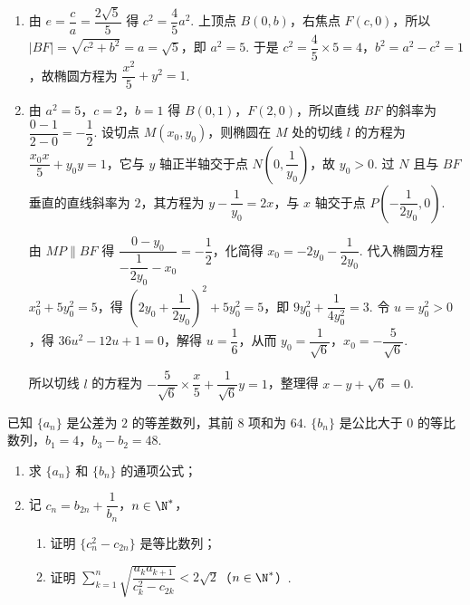 \begin{solution}
\begin{enumerate}
\item 由 \(e=\dfrac ca=\dfrac{2\sqrt5}5\) 得 \(c^2=\dfrac45a^2\). 上顶点 \(B(0,b)\)，右焦点 \(F(c,0)\)，所以 \(|BF|=\sqrt{c^2+b^2}=a=\sqrt5\)，即 \(a^2=5\). 于是 \(c^2=\dfrac45\times5=4\)，\(b^2=a^2-c^2=1\)，故椭圆方程为 \(\dfrac{x^2}5+y^2=1\).

\item 由 \(a^2=5\)，\(c=2\)，\(b=1\) 得 \(B(0,1)\)，\(F(2,0)\)，所以直线 \(BF\) 的斜率为 \(\dfrac{0-1}{2-0}=-\dfrac12\). 设切点 \(M(x_0,y_0)\)，则椭圆在 \(M\) 处的切线 \(l\) 的方程为 \(\dfrac{x_0x}5+y_0y=1\)，它与 \(y\) 轴正半轴交于点 \(N\left(0,\dfrac1{y_0}\right)\)，故 \(y_0>0\). 过 \(N\) 且与 \(BF\) 垂直的直线斜率为 \(2\)，其方程为 \(y-\dfrac1{y_0}=2x\)，与 \(x\) 轴交于点 \(P\left(-\dfrac1{2y_0},0\right)\).

由 \(MP\parallel BF\) 得 \(\dfrac{0-y_0}{-\dfrac1{2y_0}-x_0}=-\dfrac12\)，化简得 \(x_0=-2y_0-\dfrac1{2y_0}\). 代入椭圆方程 \(x_0^2+5y_0^2=5\)，得 \(\left(2y_0+\dfrac1{2y_0}\right)^2+5y_0^2=5\)，即 \(9y_0^2+\dfrac1{4y_0^2}=3\). 令 \(u=y_0^2>0\)，得 \(36u^2-12u+1=0\)，解得 \(u=\dfrac16\)，从而 \(y_0=\dfrac1{\sqrt6}\)，\(x_0=-\dfrac5{\sqrt6}\).

所以切线 \(l\) 的方程为 \(-\dfrac5{\sqrt6}\times\dfrac x5+\dfrac1{\sqrt6}y=1\)，整理得 \(x-y+\sqrt6=0\).
\end{enumerate}
\end{solution}

\begin{problem}
已知 \( \{a_n\} \) 是公差为 \( 2 \) 的等差数列，其前 \( 8 \) 项和为 \( 64 \). \( \{b_n\} \) 是公比大于 \( 0 \) 的等比数列，\( b_1=4 \)，\( b_3-b_2=48 \).

\begin{enumerate}
\item 求 \( \{a_n\} \) 和 \( \{b_n\} \) 的通项公式；
\item 记 \( c_n=b_{2n}+\dfrac{1}{b_n} \)，\( n\in \N^* \)，
\begin{enumerate}
\item 证明 \( \{c_n^2-c_{2n}\} \) 是等比数列；
\item 证明 \( \sum_{k=1}^n \sqrt{\dfrac{a_ka_{k+1}}{c_k^2-c_{2k}}}<2\sqrt2 \)（\(n\in \N^*\)）.
\end{enumerate}
\end{enumerate}
\end{problem}


